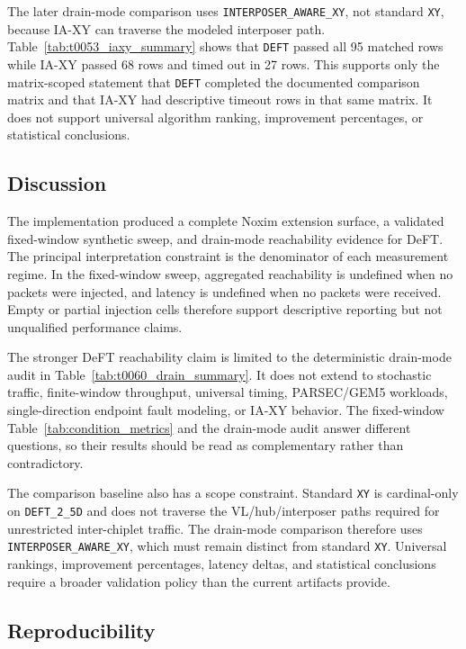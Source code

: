 \documentclass[conference]{IEEEtran}
\begin{document}
The later drain-mode comparison uses \texttt{INTERPOSER\_AWARE\_XY}, not standard \texttt{XY}, because IA-XY can traverse the modeled interposer path. Table~\ref{tab:t0053_iaxy_summary} shows that \texttt{DEFT} passed all 95 matched rows while IA-XY passed 68 rows and timed out in 27 rows. This supports only the matrix-scoped statement that \texttt{DEFT} completed the documented comparison matrix and that IA-XY had descriptive timeout rows in that same matrix. It does not support universal algorithm ranking, improvement percentages, or statistical conclusions.

\subsection{Discussion}

The implementation produced a complete Noxim extension surface, a validated fixed-window synthetic sweep, and drain-mode reachability evidence for DeFT. The principal interpretation constraint is the denominator of each measurement regime. In the fixed-window sweep, aggregated reachability is undefined when no packets were injected, and latency is undefined when no packets were received. Empty or partial injection cells therefore support descriptive reporting but not unqualified performance claims.

The stronger DeFT reachability claim is limited to the deterministic drain-mode audit in Table~\ref{tab:t0060_drain_summary}. It does not extend to stochastic traffic, finite-window throughput, universal timing, PARSEC/GEM5 workloads, single-direction endpoint fault modeling, or IA-XY behavior. The fixed-window Table~\ref{tab:condition_metrics} and the drain-mode audit answer different questions, so their results should be read as complementary rather than contradictory.

The comparison baseline also has a scope constraint. Standard \texttt{XY} is cardinal-only on \texttt{DEFT\_2\_5D} and does not traverse the VL/hub/interposer paths required for unrestricted inter-chiplet traffic. The drain-mode comparison therefore uses \texttt{INTERPOSER\_AWARE\_XY}, which must remain distinct from standard \texttt{XY}. Universal rankings, improvement percentages, latency deltas, and statistical conclusions require a broader validation policy than the current artifacts provide.

\subsection{Reproducibility}
\end{document}
